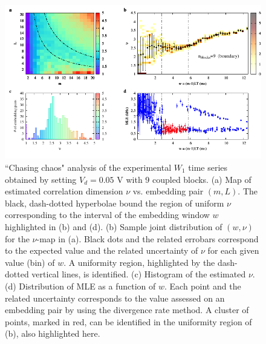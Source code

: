 \begin{figure}[H]
    \centering
    \includegraphics[width=\linewidth]{../blocks/9_blocks/edge/2e5_points/plots/chaos_low.pdf}
    \caption{``Chasing chaos" analysis of the experimental $W_1$ time series obtained by setting $V_d=0.05$ V with 9 coupled blocks.
    (a) Map of estimated correlation dimension $\nu$ vs. embedding pair $(m, L)$.
    The black, dash-dotted hyperbolae bound the region of uniform $\nu$ corresponding to the interval of the
    embedding window $w$ highlighted in (b) and (d).
    (b) Sample joint distribution of $(w,\nu)$ for the $\nu$-map in (a).
    Black dots and the related errobars correspond to the expected value and the related uncertainty of $\nu$
    for each given value (bin) of $w$. A uniformity region, highlighted by the dash-dotted vertical lines,
    is identified. (c) Histogram of the estimated $\nu$. (d) Distribution of MLE as a function of $w$. Each point and the related
    uncertainty corresponds to the value assessed on an embedding pair by using the divergence rate method.
    A cluster of points, marked in red, can be identified in the uniformity region of (b), also highlighted here.}
    \label{fig:9 blocks chaos}
\end{figure}

